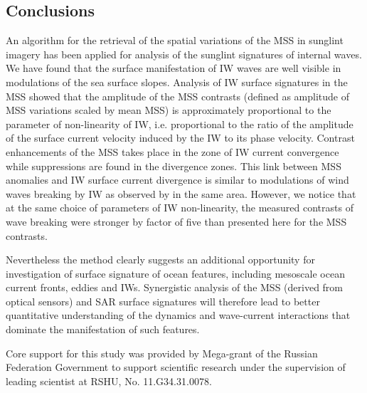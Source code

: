 \documentclass[draft,grl]{agutex}
\begin{document}
\begin{article}
\section{Conclusions}

An algorithm for the retrieval of the spatial variations of the MSS in sunglint imagery has been applied for analysis of the sunglint signatures of internal waves. We have found that the surface manifestation of IW waves are well visible in modulations of the sea surface slopes. Analysis of IW surface signatures in the MSS showed that the amplitude of the MSS contrasts (defined as amplitude of MSS variations scaled by mean MSS) is approximately proportional to the parameter of non-linearity of IW, i.e. proportional to the ratio of the amplitude of the surface current velocity induced by the IW to its phase velocity. Contrast enhancements of the MSS takes place in the zone of IW current convergence while suppressions are found in the divergence zones. This link between MSS anomalies and IW surface current divergence is similar to modulations of wind waves breaking by IW as observed by \cite{Dulov1986} in the same area. However, we notice that at the same choice of parameters of IW non-linearity, the measured contrasts of wave breaking were stronger by factor of five than presented here for the MSS contrasts.

Nevertheless the method clearly suggests an additional opportunity for investigation of surface signature of ocean features, including mesoscale ocean current fronts, eddies and IWs. Synergistic analysis of the MSS (derived from optical sensors) and SAR surface signatures will therefore lead to better quantitative understanding of the dynamics and wave-current interactions that dominate the manifestation of such features.


\begin{acknowledgments}

Core support for this study was provided by Mega-grant of the Russian Federation Government to support scientific research under the supervision of leading scientist at RSHU, No. 11.G34.31.0078.

\end{acknowledgments}



\end{article}
\end{document}
